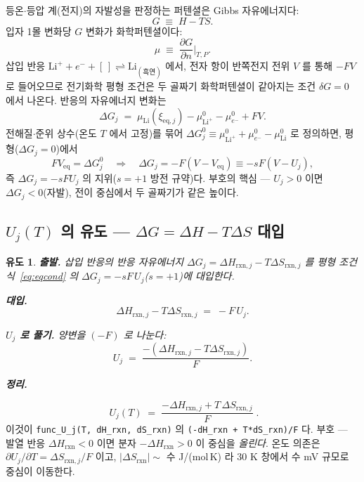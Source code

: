\documentclass[11pt,a4paper]{article}
\newtheorem*{derivebox}{유도}
\newcommand{\eq}{\mathrm{eq}}
\newcommand{\rxn}{\mathrm{rxn}}
\newcommand{\code}[1]{\texttt{#1}}
\begin{document}
등온$\cdot$등압 계(전지)의 자발성을 판정하는 퍼텐셜은 Gibbs 자유에너지다:
\begin{equation}
G\;\equiv\;H-TS.
\label{eq:gibbsdef}
\end{equation}
입자 1몰 변화당 $G$ 변화가 화학퍼텐셜이다:
\begin{equation}
\mu\;\equiv\;\frac{\partial G}{\partial n}\Big|_{T,P}.
\label{eq:mudef}
\end{equation}
삽입 반응 $\mathrm{Li}^++e^-+[\,]\rightleftharpoons\mathrm{Li}_{(\text{흑연})}$ 에서, 전자 항이 반쪽전지 전위 $V$ 를 통해
$-FV$ 로 들어오므로 전기화학 평형 조건은 두 골짜기 화학퍼텐셜이 같아지는 조건 $\delta G=0$ 에서 나온다. 반응의 자유에너지 변화는
\begin{equation}
\Delta G_j\;=\;\mu_{\mathrm{Li}}(\xi_{\eq,j})-\mu^0_{\mathrm{Li}^+}-\mu^0_{e^-}+FV.
\label{eq:dGdef}
\end{equation}
전해질$\cdot$준위 상수(온도 $T$ 에서 고정)를 묶어 $\Delta G_j^0\equiv\mu^0_{\mathrm{Li}^+}+\mu^0_{e^-}-\mu^0_{\mathrm{Li}}$ 로 정의하면, 평형($\Delta G_j=0$)에서
\begin{equation}
FV_{\eq}=\Delta G_j^0\quad\Longrightarrow\quad \Delta G_j=-F(V-V_{\eq})\equiv-sF(V-U_j),
\label{eq:eqcond}
\end{equation}
즉 $\Delta G_j=-sFU_j$ 의 지위($s=+1$ 방전 규약)다. 부호의 핵심 — $U_j>0$ 이면 $\Delta G_j<0$(자발), 전이 중심에서 두 골짜기가 같은 높이다.

\subsection{$U_j(T)$ 의 유도 — $\Delta G = \Delta H - T\Delta S$ 대입}

\begin{derivebox}
\textbf{출발.} 삽입 반응의 반응 자유에너지 $\Delta G_j=\Delta H_{\rxn,j}-T\Delta S_{\rxn,j}$ 를 평형 조건 식~\eqref{eq:eqcond} 의 $\Delta G_j=-sF\,U_j$($s=+1$)에 대입한다.

\textbf{대입.}
\begin{equation*}
\Delta H_{\rxn,j}-T\Delta S_{\rxn,j}\;=\;-F\,U_j.
\end{equation*}

\textbf{$U_j$ 로 풀기.} 양변을 $(-F)$ 로 나눈다:
\begin{equation*}
U_j\;=\;\frac{-(\Delta H_{\rxn,j}-T\Delta S_{\rxn,j})}{F}.
\end{equation*}

\textbf{정리.}
\end{derivebox}
\begin{equation}
\boxed{\;U_j(T)\;=\;\frac{-\Delta H_{\rxn,j}+T\,\Delta S_{\rxn,j}}{F}\;.}
\label{eq:Uj}
\end{equation}
이것이 \code{func\_U\_j(T, dH\_rxn, dS\_rxn)} 의 \code{(-dH\_rxn + T*dS\_rxn)/F} 다. 부호 — 발열 반응
$\Delta H_\rxn<0$ 이면 분자 $-\Delta H_\rxn>0$ 이 중심을 \emph{올린다}. 온도 의존은
$\partial U_j/\partial T=\Delta S_{\rxn,j}/F$ 이고, $|\Delta S_\rxn|\sim$ 수 J/(mol\,K) 라 $30$ K 창에서 수 mV
규모로 중심이 이동한다.
\end{document}
